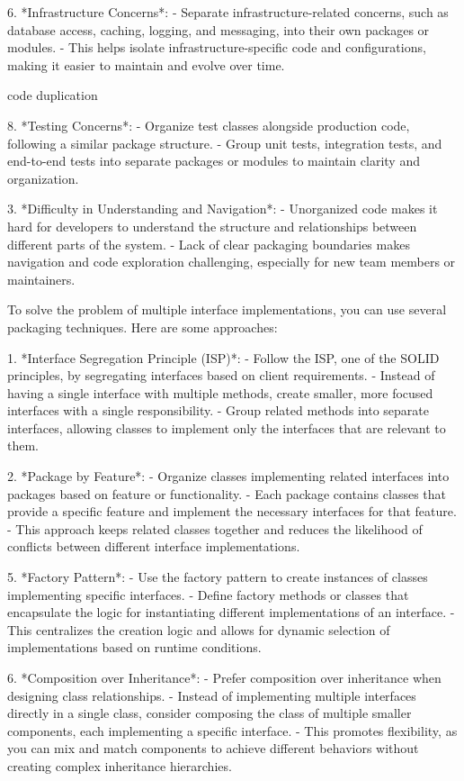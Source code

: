 6. *Infrastructure Concerns*:
- Separate infrastructure-related concerns, such as database access, caching, logging, and messaging, into their own packages or modules.
- This helps isolate infrastructure-specific code and configurations, making it easier to maintain and evolve over time.

code duplication


8. *Testing Concerns*:
- Organize test classes alongside production code, following a similar package structure.
- Group unit tests, integration tests, and end-to-end tests into separate packages or modules to maintain clarity and organization.

3. *Difficulty in Understanding and Navigation*:
- Unorganized code makes it hard for developers to understand the structure and relationships between different parts of the system.
- Lack of clear packaging boundaries makes navigation and code exploration challenging, especially for new team members or maintainers.


To solve the problem of multiple interface implementations, you can use several packaging techniques. Here are some approaches:

1. *Interface Segregation Principle (ISP)*:
- Follow the ISP, one of the SOLID principles, by segregating interfaces based on client requirements.
- Instead of having a single interface with multiple methods, create smaller, more focused interfaces with a single responsibility.
- Group related methods into separate interfaces, allowing classes to implement only the interfaces that are relevant to them.

2. *Package by Feature*:
- Organize classes implementing related interfaces into packages based on feature or functionality.
- Each package contains classes that provide a specific feature and implement the necessary interfaces for that feature.
- This approach keeps related classes together and reduces the likelihood of conflicts between different interface implementations.

5. *Factory Pattern*:
- Use the factory pattern to create instances of classes implementing specific interfaces.
- Define factory methods or classes that encapsulate the logic for instantiating different implementations of an interface.
- This centralizes the creation logic and allows for dynamic selection of implementations based on runtime conditions.

6. *Composition over Inheritance*:
- Prefer composition over inheritance when designing class relationships.
- Instead of implementing multiple interfaces directly in a single class, consider composing the class of multiple smaller components, each implementing a specific interface.
- This promotes flexibility, as you can mix and match components to achieve different behaviors without creating complex inheritance hierarchies.

